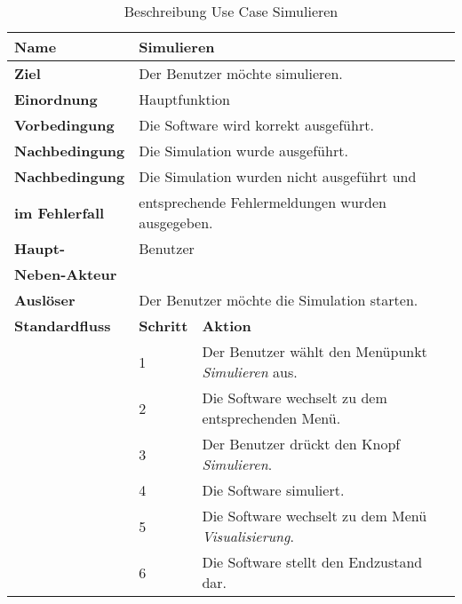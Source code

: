 \begin{table} [H]
        \centering
        \begin{tabular}{|l|l|l|}
                \hline
                \textbf{Name}           & \multicolumn{2}{|l|}{Simulieren}  \\
                \hline
                \textbf{Ziel}           & \multicolumn{2}{|l|}{Der Benutzer möchte simulieren. }\\ 
                \hline
                \textbf{Einordnung}     & \multicolumn{2}{|l|}{Hauptfunktion}\\
                \hline
                \textbf{Vorbedingung}   & \multicolumn{2}{|l|}{Die Software wird korrekt ausgeführt.} \\
                \hline
                \textbf{Nachbedingung}  & \multicolumn{2}{|l|}{Die Simulation wurde ausgeführt.}\\
                \hline
                \textbf{Nachbedingung}  & \multicolumn{2}{|l|}{Die Simulation wurden nicht ausgeführt und}\\
                \textbf{im Fehlerfall}  & \multicolumn{2}{|l|}{entsprechende Fehlermeldungen wurden ausgegeben.}\\
                \hline
                \textbf{Haupt-}                         & \multicolumn{2}{|l|}{Benutzer}\\
                \textbf{Neben-Akteur}   & \multicolumn{2}{|l|}{ }                       \\
                \hline
                \textbf{Auslöser}               & \multicolumn{2}{|l|}{Der Benutzer möchte die Simulation starten.} \\
                \hline 
                \textbf{Standardfluss} & \textbf{Schritt} & \textbf{Aktion} \\
                \hline
                &		1		& Der Benutzer wählt den Menüpunkt \emph{Simulieren} aus. \\
				\cline{2-3}
				&		2		& Die Software wechselt zu dem entsprechenden Menü.\\
				\cline{2-3}
                &       3 		& Der Benutzer drückt den Knopf \emph{Simulieren}. \\
                \cline{2-3}
                &       4       & Die Software simuliert.\\
                \cline{2-3}
                &       5       & Die Software wechselt zu dem Menü \emph{Visualisierung}.\\
                \cline{2-3}
                &       6      & Die Software stellt den Endzustand dar.\\
                \hline
        \end{tabular}
        \caption{Beschreibung Use Case Simulieren}
        \label{Beschreibung Use Case Simulieren}
\end{table}



